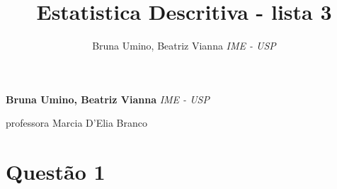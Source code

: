 \documentclass[11pt,]{article}
\title{Estatistica Descritiva - lista 3  }
\author{\Large Bruna Umino, Beatriz Vianna\vspace{0.05in} \newline\normalsize\emph{IME - USP}  }
\date{}
\newcommand*{\authorfont}{\fontfamily{phv}\selectfont}
\renewenvironment{abstract}
 {{%
    \setlength{\leftmargin}{0mm}
    \setlength{\rightmargin}{\leftmargin}%
  }%
  \relax}
 {\endlist}
\begin{document}
	
%

{%
\setlength{\parindent}{0pt}
\thispagestyle{plain}
{\fontsize{18}{20}\selectfont\raggedright 
\maketitle  %

}

{
   \vskip 13.5pt\relax \normalsize\fontsize{11}{12} 
\textbf{\authorfont Bruna Umino, Beatriz Vianna} \hskip 15pt \emph{\small IME - USP}   

}

}







\begin{abstract}

    \hbox{\vrule height .2pt width 39.14pc}

    \vskip 8.5pt %

\noindent professora Marcia D'Elia Branco


    \hbox{\vrule height .2pt width 39.14pc}


\end{abstract}


\vskip 6.5pt

\noindent  \section{Questão 1}\label{questao-1}
\end{document}
